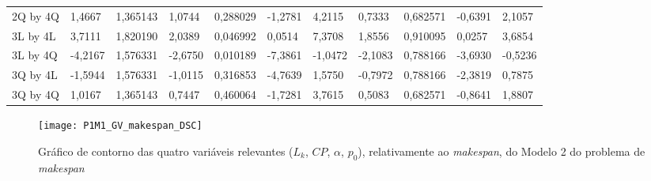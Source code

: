 \begin{table}[H]
{\begin{tabular}{lllllllllll}
\rowcolor[HTML]{FFFFFF} 
{\color[HTML]{000000} 2Q by 4Q}       & {\color[HTML]{000000} 1,4667}   & {\color[HTML]{000000} 1,365143} & {\color[HTML]{000000} 1,0744}   & {\color[HTML]{000000} 0,288029} & {\color[HTML]{000000} -1,2781}        & {\color[HTML]{000000} 4,2115}         & {\color[HTML]{000000} 0,7333}   & {\color[HTML]{000000} 0,682571}      & {\color[HTML]{000000} -0,6391}        & {\color[HTML]{000000} 2,1057}         \\
\rowcolor[HTML]{FFFFFF} 
{\color[HTML]{000000} 3L by 4L}       & {\color[HTML]{FF0000} 3,7111}   & {\color[HTML]{FF0000} 1,820190} & {\color[HTML]{FF0000} 2,0389}   & {\color[HTML]{FF0000} 0,046992} & {\color[HTML]{FF0000} 0,0514}         & {\color[HTML]{FF0000} 7,3708}         & {\color[HTML]{FF0000} 1,8556}   & {\color[HTML]{FF0000} 0,910095}      & {\color[HTML]{FF0000} 0,0257}         & {\color[HTML]{FF0000} 3,6854}         \\
\rowcolor[HTML]{FFFFFF} 
{\color[HTML]{000000} 3L by 4Q}       & {\color[HTML]{FF0000} -4,2167}  & {\color[HTML]{FF0000} 1,576331} & {\color[HTML]{FF0000} -2,6750}  & {\color[HTML]{FF0000} 0,010189} & {\color[HTML]{FF0000} -7,3861}        & {\color[HTML]{FF0000} -1,0472}        & {\color[HTML]{FF0000} -2,1083}  & {\color[HTML]{FF0000} 0,788166}      & {\color[HTML]{FF0000} -3,6930}        & {\color[HTML]{FF0000} -0,5236}        \\
\rowcolor[HTML]{FFFFFF} 
{\color[HTML]{000000} 3Q by 4L}       & {\color[HTML]{000000} -1,5944}  & {\color[HTML]{000000} 1,576331} & {\color[HTML]{000000} -1,0115}  & {\color[HTML]{000000} 0,316853} & {\color[HTML]{000000} -4,7639}        & {\color[HTML]{000000} 1,5750}         & {\color[HTML]{000000} -0,7972}  & {\color[HTML]{000000} 0,788166}      & {\color[HTML]{000000} -2,3819}        & {\color[HTML]{000000} 0,7875}         \\
\rowcolor[HTML]{FFFFFF} 
{\color[HTML]{000000} 3Q by 4Q}       & {\color[HTML]{000000} 1,0167}   & {\color[HTML]{000000} 1,365143} & {\color[HTML]{000000} 0,7447}   & {\color[HTML]{000000} 0,460064} & {\color[HTML]{000000} -1,7281}        & {\color[HTML]{000000} 3,7615}         & {\color[HTML]{000000} 0,5083}   & {\color[HTML]{000000} 0,682571}      & {\color[HTML]{000000} -0,8641}        & {\color[HTML]{000000} 1,8807}        
\end{tabular}
}
\end{table}

\begin{figure}[H]
\caption{Gráfico de contorno das quatro variáveis relevantes ($L_{k}$, $CP$, $\alpha$, $p_{0}$), relativamente ao \textit{makespan}, do Modelo 2 do problema de \textit{makespan}}
\centering
\texttt{[image: P1M1\_GV\_makespan\_DSC]}
\end{figure}


